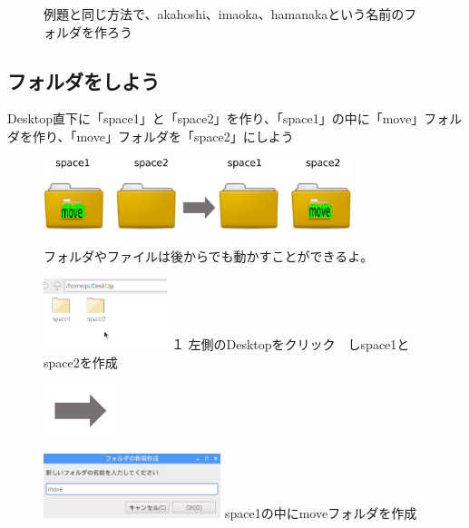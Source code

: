 \documentclass[a4paper,12pt]{jarticle}
\begin{document}
\begin{figure}
  例題と同じ方法で、akahoshi、imaoka、hamanakaという名前のフォルダを作ろう

\end{figure}
\clearpage
{}
\subsection{\theExercise フォルダをしよう}
Desktop直下に「space1」と「space2」を作り、「space1」の中に「move」フォルダを作り、「move」フォルダを「space2」にしよう



\begin{figure}[ht]
  \centering
  \includegraphics[width=0.8\textwidth]{fig15-1.eps}
  \begin{minipage}{15.297cm}
    フォルダやファイルは後からでも動かすことができるよ。
  \end{minipage}

  \begin{minipage}{5.963cm}
    \includegraphics[width=3.604cm]{textbook-img051.png}
    {\flushleft
      １
      左側のDesktopをクリック　しspace1とspace2を作成
    }
  \end{minipage}
  \includegraphics[width=2.168cm]{textbook-img052.png}
  \begin{minipage}{7.473cm}
    \includegraphics[width=5.166cm]{textbook-img050.png}
    { space1の中にmoveフォルダを作成
    }
  \end{minipage}


\end{figure}
\end{document}
